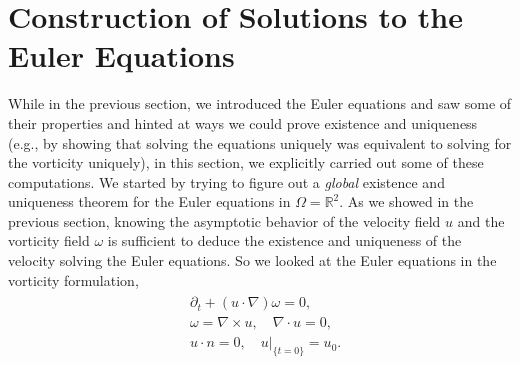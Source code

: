 \documentclass{article}
\begin{document}
	\section{Construction of Solutions to the Euler Equations}
	While in the previous section, we introduced the Euler equations and saw some of their properties and hinted at ways we could prove existence and uniqueness (e.g., by showing that solving the equations uniquely was equivalent to solving for the vorticity uniquely), in this section, we explicitly carried out some of these computations. We started by trying to figure out a \textit{global} existence and uniqueness theorem for the Euler equations in $\Omega = \mathbb{R}^{2}$. As we showed in the previous section, knowing the asymptotic behavior of the velocity field $u$ and the vorticity field $\omega$ is sufficient to deduce the existence and uniqueness of the velocity solving the Euler equations. So we looked at the Euler equations in the vorticity formulation, 
	\begin{align*}
		\begin{split}
			&\partial_{t} + (u \cdot \nabla)\omega = 0, \\
			&\omega = \nabla \times u, \quad \nabla \cdot u = 0, \\
			&u \cdot n = 0, \quad u|_{\{t = 0\}} = u_{0}. 
		\end{split} 
	\end{align*} 
\end{document}
